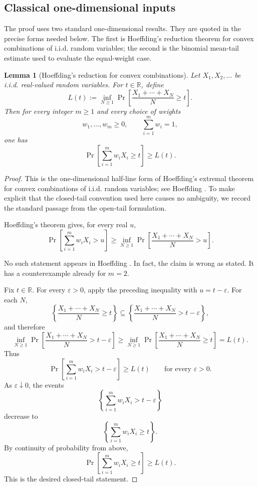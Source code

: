 \documentclass[12pt]{article}
\theoremstyle{definition}
\theoremstyle{plain}
\newtheorem{lemma}[definition]{Lemma}
\theoremstyle{remark}
\newcommand{\review}[1]{\begin{reviewbox}#1\end{reviewbox}}
\begin{document}
\subsection{Classical one-dimensional inputs}

The proof uses two standard one-dimensional results. They are quoted in the precise forms needed below. The first is Hoeffding's reduction theorem for convex combinations of i.i.d. random variables; the second is the binomial mean-tail estimate used to evaluate the equal-weight case.

\begin{lemma}[Hoeffding's reduction for convex combinations]\label{lem:hoeffding}
Let \(X_1,X_2,\ldots\) be i.i.d. real-valued random variables. For \(t\in\mathbb R\), define
\[
L(t):=\inf_{N\ge1}
\Pr\!\left[\frac{X_1+\cdots+X_N}{N}\ge t\right].
\]
Then for every integer \(m\ge1\) and every choice of weights
\[
w_1,\ldots,w_m\ge0,\qquad \sum_{i=1}^{m}w_i=1,
\]
one has
\[
\Pr\!\left[\sum_{i=1}^{m} w_iX_i\ge t\right]\ge L(t).
\]
\end{lemma}

\begin{proof}
This is the one-dimensional half-line form of Hoeffding's extremal theorem for convex combinations of i.i.d. random variables; see Hoeffding \cite{Hoeffding1955}. To make explicit that the closed-tail convention used here causes no ambiguity, we record the standard passage from the open-tail formulation.

Hoeffding's theorem gives, for every real \(u\),
\[
\Pr\!\left[\sum_{i=1}^{m}w_iX_i>u\right]
\ge
\inf_{N\ge1}
\Pr\!\left[\frac{X_1+\cdots+X_N}{N}>u\right].
\]
\review{ No such statement appears in Hoeffding  \cite{Hoeffding1955}. In fact, the claim is wrong as stated. It has a counterexample already for $m = 2$.}

Fix \(t\in\mathbb R\). For every \(\varepsilon>0\), apply the preceding inequality with \(u=t-\varepsilon\). For each \(N\),
\[
\left\{\frac{X_1+\cdots+X_N}{N}\ge t\right\}
\subseteq
\left\{\frac{X_1+\cdots+X_N}{N}>t-\varepsilon\right\},
\]
and therefore
\[
\inf_{N\ge1}
\Pr\!\left[\frac{X_1+\cdots+X_N}{N}>t-\varepsilon\right]
\ge
\inf_{N\ge1}
\Pr\!\left[\frac{X_1+\cdots+X_N}{N}\ge t\right]
=L(t).
\]
Thus
\[
\Pr\!\left[\sum_{i=1}^{m}w_iX_i>t-\varepsilon\right]\ge L(t)
\qquad\text{for every }\varepsilon>0.
\]
As \(\varepsilon\downarrow0\), the events
\[
\left\{\sum_{i=1}^{m}w_iX_i>t-\varepsilon\right\}
\]
decrease to
\[
\left\{\sum_{i=1}^{m}w_iX_i\ge t\right\}.
\]
By continuity of probability from above,
\[
\Pr\!\left[\sum_{i=1}^{m}w_iX_i\ge t\right]\ge L(t).
\]
This is the desired closed-tail statement.
\end{proof}
\end{document}
